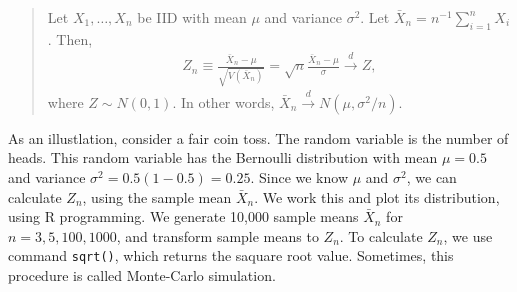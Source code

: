 \documentclass[
  12pt,
]{article}
\begin{document}
\begin{quote}
Let \(X_1, \ldots, X_n\) be IID with mean \(\mu\) and variance
\(\sigma^2\). Let \(\bar{X}_n = n^{-1} \sum_{i=1}^n X_i\). Then,
\begin{align*}
Z_n \equiv \frac{\bar{X}_n - \mu}{\sqrt{V(\bar{X}_n)}} = \sqrt{n}\frac{\bar{X}_n - \mu}{\sigma} \stackrel{d}{\to} Z,
\end{align*} where \(Z \sim N(0, 1)\). In other words,
\(\bar{X}_n \stackrel{d}{\to} N(\mu, \sigma^2/n)\).
\end{quote}

As an illustlation, consider a fair coin toss. The random variable is
the number of heads. This random variable has the Bernoulli distribution
with mean \(\mu = 0.5\) and variance \(\sigma^2 = 0.5(1 - 0.5) = 0.25\).
Since we know \(\mu\) and \(\sigma^2\), we can calculate \(Z_n\), using
the sample mean \(\bar{X}_n\). We work this and plot its distribution,
using R programming. We generate 10,000 sample means \(\bar{X}_n\) for
\(n = 3, 5, 100, 1000\), and transform sample means to \(Z_n\). To
calculate \(Z_n\), we use command \texttt{sqrt()}, which returns the
saquare root value. Sometimes, this procedure is called Monte-Carlo
simulation.
\end{document}
